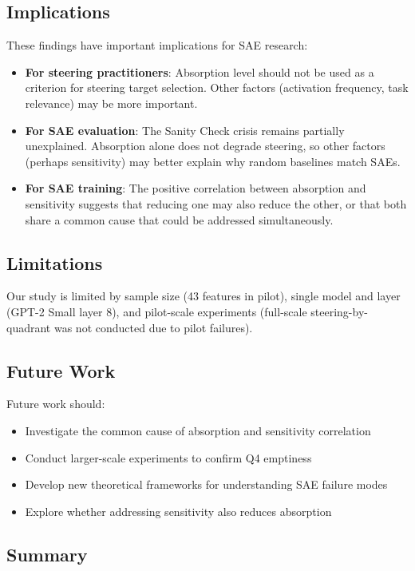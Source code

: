 \documentclass{article}
\begin{document}
\subsection{Implications}

These findings have important implications for SAE research:

\begin{itemize}
  \item \textbf{For steering practitioners}: Absorption level should not be used as a criterion for steering target selection. Other factors (activation frequency, task relevance) may be more important.
  \item \textbf{For SAE evaluation}: The Sanity Check crisis remains partially unexplained. Absorption alone does not degrade steering, so other factors (perhaps sensitivity) may better explain why random baselines match SAEs.
  \item \textbf{For SAE training}: The positive correlation between absorption and sensitivity suggests that reducing one may also reduce the other, or that both share a common cause that could be addressed simultaneously.
\end{itemize}

\subsection{Limitations}

Our study is limited by sample size (43 features in pilot), single model and layer (GPT-2 Small layer 8), and pilot-scale experiments (full-scale steering-by-quadrant was not conducted due to pilot failures).

\subsection{Future Work}

Future work should:
\begin{itemize}
  \item Investigate the common cause of absorption and sensitivity correlation
  \item Conduct larger-scale experiments to confirm Q4 emptiness
  \item Develop new theoretical frameworks for understanding SAE failure modes
  \item Explore whether addressing sensitivity also reduces absorption
\end{itemize}

\subsection{Summary}
\end{document}
